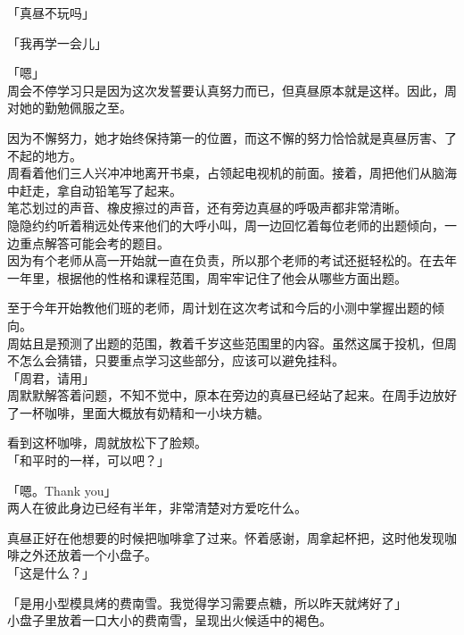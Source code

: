 「真昼不玩吗」

「我再学一会儿」

「嗯」\\

周会不停学习只是因为这次发誓要认真努力而已，但真昼原本就是这样。因此，周对她的勤勉佩服之至。

因为不懈努力，她才始终保持第一的位置，而这不懈的努力恰恰就是真昼厉害、了不起的地方。\\

周看着他们三人兴冲冲地离开书桌，占领起电视机的前面。接着，周把他们从脑海中赶走，拿自动铅笔写了起来。\\

笔芯划过的声音、橡皮擦过的声音，还有旁边真昼的呼吸声都非常清晰。\\

隐隐约约听着稍远处传来他们的大呼小叫，周一边回忆着每位老师的出题倾向，一边重点解答可能会考的题目。\\

因为有个老师从高一开始就一直在负责，所以那个老师的考试还挺轻松的。在去年一年里，根据他的性格和课程范围，周牢牢记住了他会从哪些方面出题。

至于今年开始教他们班的老师，周计划在这次考试和今后的小测中掌握出题的倾向。\\

周姑且是预测了出题的范围，教着千岁这些范围里的内容。虽然这属于投机，但周不怎么会猜错，只要重点学习这些部分，应该可以避免挂科。\\

「周君，请用」\\

周默默解答着问题，不知不觉中，原本在旁边的真昼已经站了起来。在周手边放好了一杯咖啡，里面大概放有奶精和一小块方糖。

看到这杯咖啡，周就放松下了脸颊。\\

「和平时的一样，可以吧？」

「嗯。Thank you」\\

两人在彼此身边已经有半年，非常清楚对方爱吃什么。

真昼正好在他想要的时候把咖啡拿了过来。怀着感谢，周拿起杯把，这时他发现咖啡之外还放着一个小盘子。\\

「这是什么？」

「是用小型模具烤的费南雪。我觉得学习需要点糖，所以昨天就烤好了」\\

小盘子里放着一口大小的费南雪，呈现出火候适中的褐色。\\

